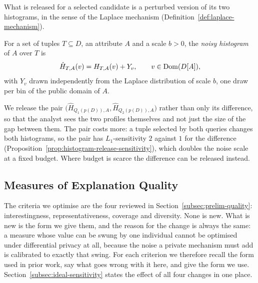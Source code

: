 What is released for a selected candidate is a perturbed version of its two histograms, in the sense of the Laplace mechanism (Definition~\ref{def:laplace-mechanism}).

\begin{definition}
\label{def:noisy-histogram}
For a set of tuples $T\subseteq D$, an attribute $A$ and a scale $b>0$, the \emph{noisy histogram} of $A$ over $T$ is
\[
\hat H_{T,A}(v)=H_{T,A}(v)+Y_v,\qquad v\in\operatorname{Dom}(D[A]),
\]
with $Y_v$ drawn independently from the Laplace distribution of scale $b$, one draw per bin of the public domain of $A$.
\end{definition}

We release the pair $\big(\hat H_{Q_1(p(D)),A},\hat H_{Q_2(p(D)),A}\big)$ rather than only its difference, so that the analyst sees the two profiles themselves and not just the size of the gap between them.
The pair costs more: a tuple selected by both queries changes both histograms, so the pair has $L_1$-sensitivity $2$ against $1$ for the difference (Proposition~\ref{prop:histogram-release-sensitivity}), which doubles the noise scale at a fixed budget.
Where budget is scarce the difference can be released instead.



\subsection{Measures of Explanation Quality}
\label{sec:explanation-quality}

The criteria we optimise are the four reviewed in Section~\ref{subsec:prelim-quality}: interestingness, representativeness, coverage and diversity.
None is new.
What is new is the form we give them, and the reason for the change is always the same: a measure whose value can be swung by one individual cannot be optimised under differential privacy at all, because the noise a private mechanism must add is calibrated to exactly that swing.
For each criterion we therefore recall the form used in prior work, say what goes wrong with it here, and give the form we use.
Section~\ref{subsec:ideal-sensitivity} states the effect of all four changes in one place.

